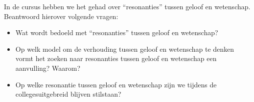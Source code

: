 \documentclass[main.tex]{subfiles}
\begin{document}
\begin{examenvraag}
    \begin{vraag}
        In de cursus hebben we het gehad over “resonanties” tussen geloof en wetenschap. Beantwoord hierover volgende vragen:
        \begin{itemize}
            \item Wat wordt bedoeld met “resonanties” tussen geloof en wetenschap?
            \item Op welk model om de verhouding tussen geloof en wetenschap te denken vormt het zoeken naar resonanties tussen geloof en wetenschap een aanvulling? Waarom?
            \item Op welke resonantie tussen geloof en wetenschap zijn we tijdens de collegesuitgebreid blijven stilstaan?
        \end{itemize}
    \end{vraag}

    \begin{antwoord}
    \end{antwoord}
\end{examenvraag}
\end{document}

